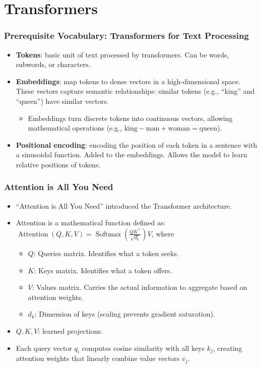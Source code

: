 \documentclass{beamer}
\begin{document}
\section{Transformers}
\begin{frame}
\frametitle{Prerequisite Vocabulary: Transformers for Text Processing}
\begin{itemize}
    \item \textbf{Tokens}: basic unit of text processed by transformers. Can be words, subwords, or characters.
    \item \textbf{Embeddings}: map tokens to dense vectors in a high-dimensional space. These vectors capture semantic relationships: similar tokens (e.g., ``king'' and ``queen'') have similar vectors.
    \begin{itemize}
        \item Embeddings turn discrete tokens into continuous vectors, allowing mathematical operations (e.g., $\text{king} - \text{man} + \text{woman} = \text{queen}$).
    \end{itemize}
    \item \textbf{Positional encoding}: encoding the position of each token in a sentence with a sinusoidal function. Added to the embeddings. Allows the model to learn relative positions of tokens.
\end{itemize}
\end{frame}

\begin{frame}
\frametitle{Attention is All You Need}
\begin{itemize}
    \item ``Attention is All You Need'' \cite{vaswani2023attentionneed} introduced the Transformer architecture.
    \item Attention is a mathematical function defined as:\\
    $ \operatorname{Attention}(Q, K, V) = \operatorname{Softmax}\left( \frac{QK^\top}{\sqrt{d_k}} \right) V $, where
    \begin{itemize}
        \item $Q$: Queries matrix. Identifies what a token seeks.
        \item $K$: Keys matrix. Identifies what a token offers.
        \item $V$: Values matrix. Carries the actual information to aggregate based on attention weights.
        \item $d_k$: Dimension of keys (scaling prevents gradient saturation).
    \end{itemize}
    \item $Q, K, V$: learned projections.
    \item Each query vector $q_i$ computes cosine similarity with all keys $k_j$, creating attention weights that linearly combine value vectors $v_j$.
\end{itemize}
\end{frame}
\end{document}
